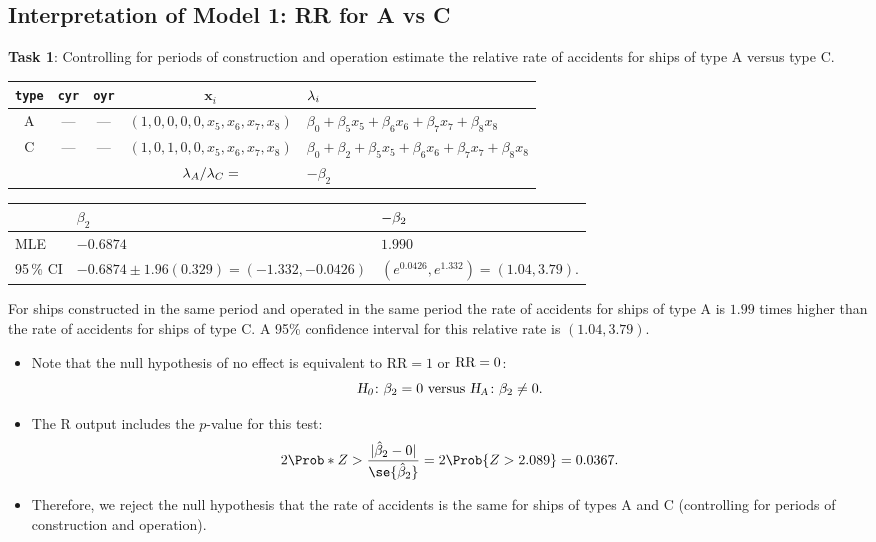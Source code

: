 \documentclass{article}\usepackage[]{graphicx}\usepackage[svgnames]{xcolor}
\let\exp\relax%
\let\log\relax%
\newcommand{\HN}{\textsl{H}_{\textsl{0}}}%
\newcommand{\HA}{\textsl{H}_{\textsl{A}}}%
\newcommand{\RR}{\text{RR}}%
\DeclarePairedDelimiter\abs{\lvert}{\rvert}
\providecommand{\Vector}[1]{\bm{#1}}%
\begin{document}
\subsection*{Interpretation of Model 1: RR for A vs C}
\begin{Example}{}
      \textbf{Task 1}: Controlling for periods of construction and operation estimate the relative rate of
      accidents for ships of type A versus type C.
\end{Example}
\begin{table}[H]
      \centering
      \begin{tabular}{ccccl}
            \texttt{type} & \texttt{cyr} & \texttt{oyr} & $ \Vector{x}_i $                & $ \log{\lambda_i} $                                             \\
            \midrule
            A             & ---          & ---          & $ (1,0,0,0,0,x_5,x_6,x_7,x_8) $ & $ \beta_0+\beta_5x_5+\beta_6x_6+\beta_7x_7+\beta_8x_8 $         \\
            C             & ---          & ---          & $ (1,0,1,0,0,x_5,x_6,x_7,x_8) $ & $ \beta_0+\beta_2+\beta_5x_5+\beta_6x_6+\beta_7x_7+\beta_8x_8 $ \\
            \midrule
                          &              &              & $ \log{\lambda_A/\lambda_C}= $  & $ -\beta_2 $
      \end{tabular}
\end{table}
\begin{table}[H]
      \centering
      \begin{tabular}{lll}
                      & $ \beta_2 $                                 & $ \exp{-\beta_2} $                      \\
            \midrule
            MLE       & $ -0.6874 $                                 & $ 1.990 $                               \\
            95\,\% CI & $ -0.6874\pm 1.96(0.329)=(-1.332,-0.0426) $ & $ (e^{0.0426},e^{1.332})=(1.04,3.79) $.
      \end{tabular}
\end{table}
For ships constructed in the same period and operated in the same period the rate of
accidents for ships of type A is $1.99$ times higher than the rate of accidents for ships of
type C. A 95\% confidence interval for this relative rate is $(1.04, 3.79)$.
\begin{itemize}
      \item Note that the null hypothesis of no effect is equivalent to $ \RR=1 $ or $ \log{\RR}=0 $:
            \[ \HN\colon \beta_2=0\text{ versus }\HA\colon \beta_2\ne 0. \]
      \item The R output includes the $ p $-value for this test:
            \[ 2\Prob*{Z>\frac{\abs{\hat{\beta}_2-0}}{\se{\hat{\beta}_2}}}=2\Prob{Z>2.089}=0.0367. \]
      \item Therefore, we reject the null hypothesis that the rate of accidents is the same for
            ships of types A and C (controlling for periods of construction and operation).
\end{itemize}
\end{document}
